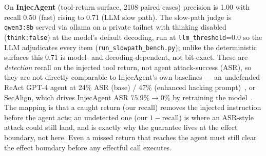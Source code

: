 \documentclass[11pt]{article}
\newcommand{\code}[1]{\texttt{\small #1}}
\begin{document}
On \textbf{InjecAgent} (tool-return
surface, 2108 paired cases) precision is 1.00 with recall 0.50 (fast) rising to 0.71 (LLM slow
path). The slow-path judge is \code{qwen3:8b} served via ollama on a private tailnet with thinking
disabled (\code{think:false}) at the model's default decoding, run at \code{llm\_threshold}=0.0 so
the LLM adjudicates every item (\code{run\_slowpath\_bench.py}); unlike the deterministic surfaces
this 0.71 is model- and decoding-dependent, not bit-exact. These are \emph{detection} recall on the injected tool return, not agent attack-success
(ASR), so they are not directly comparable to InjecAgent's own baselines --- an undefended ReAct
GPT-4 agent at 24\% ASR (base) / 47\% (enhanced hacking prompt)~\cite{injecagent}, or SecAlign,
which drives InjecAgent ASR $75.9\% \to 0\%$ by retraining the model~\cite{secalign}. The mapping is
that a caught return (our recall) removes the injected instruction before the agent acts; an
undetected one (our $1-\text{recall}$) is where an ASR-style attack could still land, and is exactly
why the guarantee lives at the effect boundary, not here. Even a missed return that reaches the agent
must still clear the effect boundary before any effectful call executes.
\end{document}
